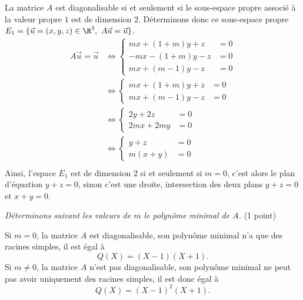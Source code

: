 {\begin{enumerate}
{La matrice $A$ est diagonalisable si et seulement si le sous-espace propre associ\'e \`a la valeur propre $1$ est de dimension $2$. D\'eterminons donc ce sous-espace propre $E_1=\{\vec u=(x,y,z)\in\R^3,\ A\vec u=\vec u\}$.
$$\begin{align*}
A\vec u=\vec u
&\iff\left\{{\begin{align*}mx+(1+m)y+z&=0 \\  -mx-(1+m)y-z&=0 \\  mx+(m-1)y-z&=0\end{align*}} \right. \\ 
&\iff\left\{{\begin{align*}mx+(1+m)y+z&=0 \\  mx+(m-1)y-z&=0\end{align*}}\right. \\ 
&\iff\left\{{\begin{align*}2y+2z&=0 \\  2mx+2my&=0\end{align*}}\right. \\ 
&\iff\left\{{\begin{align*}y+z&=0 \\  m(x+y)&=0\end{align*}}\right. \\ 
\end{align*}$$
Ainsi, l'espace $E_1$ est de dimension $2$ si et seulement si $m=0$, c'est alors le plan d'\'equation $y+z=0$, sinon c'est une droite, intersection des deux plans $y+z=0$ et $x+y=0$.

{\it D\'eterminons suivant les valeurs de $m$ le polyn\^ome minimal de $A$.} (1 point)

Si $m=0$, la matrice $A$ est diagonalisable, son polyn\^ome minimal n'a que des racines simples, il est \'egal \`a 
$$Q(X)=(X-1)(X+1).$$
Si $m\neq 0$, la matrice $A$ n'est pas diagonalisable, son polyn\^ome minimal ne peut pas avoir uniquement des racines simples, il est donc \'egal \`a
$$Q(X)=(X-1)^2(X+1).$$}
\end{enumerate}
}